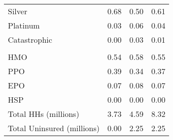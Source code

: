 \begin{tabular}{lrrr}
\hspace{1em}Silver & 0.68 & 0.50 & 0.61\\
\hspace{1em}Platinum & 0.03 & 0.06 & 0.04\\
\hspace{1em}Catastrophic & 0.00 & 0.03 & 0.01\\
\addlinespace[0.3em]
\multicolumn{4}{l}{\textbf{Network Type}}\\
\hspace{1em}HMO & 0.54 & 0.58 & 0.55\\
\hspace{1em}PPO & 0.39 & 0.34 & 0.37\\
\hspace{1em}EPO & 0.07 & 0.08 & 0.07\\
\hspace{1em}HSP & 0.00 & 0.00 & 0.00\\
Total HHs (millions) & 3.73 & 4.59 & 8.32\\
Total Uninsured (millions) & 0.00 & 2.25 & 2.25\\
\bottomrule
\end{tabular}
